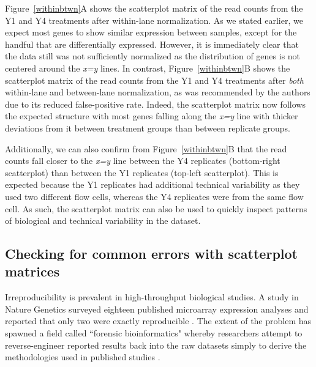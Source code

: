 \documentclass{bioinfo}
\begin{document}
Figure~\ref{withinbtwn}A shows the scatterplot matrix of the read counts from the Y1 and Y4 treatments after within-lane normalization. As we stated earlier, we expect most genes to show similar expression between samples, except for the handful that are differentially expressed. However, it is immediately clear that the data still was not sufficiently normalized as the distribution of genes is not centered around the \textit{x=y} lines. In contrast, Figure~\ref{withinbtwn}B shows the scatterplot matrix of the read counts from the Y1 and Y4 treatments after \textit{both} within-lane and between-lane normalization, as was recommended by the authors due to its reduced false-positive rate. Indeed, the scatterplot matrix now follows the expected structure with most genes falling along the \textit{x=y} line with thicker deviations from it between treatment groups than between replicate groups.

Additionally, we can also confirm from Figure~\ref{withinbtwn}B that the read counts fall closer to the \textit{x=y} line between the Y4 replicates (bottom-right scatterplot) than between the Y1 replicates (top-left scatterplot). This is expected because the Y1 replicates had additional technical variability as they used two different flow cells, whereas the Y4 replicates were from the same flow cell. As such, the scatterplot matrix can also be used to quickly inspect patterns of biological and technical variability in the dataset.

\subsection{Checking for common errors with scatterplot matrices}

Irreproducibility is prevalent in high-throughput biological studies. A study in Nature Genetics surveyed eighteen published microarray expression analyses and reported that only two were exactly reproducible \citep{Ioannidis}. The extent of the problem has spawned a field called ``forensic bioinformatics" whereby researchers attempt to reverse-engineer reported results back into the raw datasets simply to derive the methodologies used in published studies \citep{Baggerly}.
\end{document}
